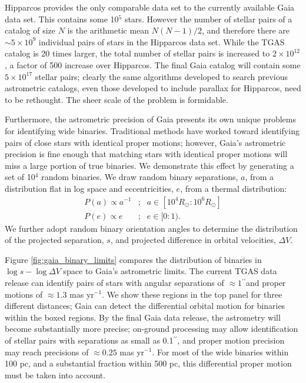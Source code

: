 \documentclass[usenatbib]{mnras}
\newcommand{\asec}{\ifmmode {^{\prime\prime}}\else$^{\prime\prime}$\fi}
\begin{document}
Hipparcos provides the only comparable data set to the currently available Gaia data set. This contains some 10$^5$ stars. However the number of stellar pairs of a catalog of size $N$ is the arithmetic mean $N(N-1)/2$, and therefore there are $\sim5\times10^9$ individual pairs of stars in the Hipparcos data set. While the TGAS catalog is 20 times larger, the total number of stellar pairs is increased to $2\times10^{12}$, a factor of 500 increase over Hipparcos. The final Gaia catalog will contain some $5\times10^{17}$ stellar pairs; clearly the same algorithms developed to search previous astrometric catalogs, even those developed to include parallax for Hipparcos, need to be rethought. The sheer scale of the problem is formidable.


Furthermore, the astrometric precision of Gaia presents its own unique problems for identifying wide binaries. Traditional methods have worked toward identifying pairs of close stars with identical proper motions; however, Gaia's astrometric precision is fine enough that matching stars with identical proper motions will miss a large portion of true binaries. We demonstrate this effect by generating a set of 10$^4$ random binaries. We draw random binary separations, $a$, from a distribution flat in log space and eccentricities, $e$, from a thermal distribution:
\begin{eqnarray}
P(a) \propto a^{-1} &;& a \in [10^4 R_{\odot}:10^6 R_{\odot}] \\
P(e) \propto e\ \ \ &;& e \in [0:1).
\end{eqnarray}
We further adopt random binary orientation angles to determine the distribution of the projected separation, $s$, and projected difference in orbital velocities, $\Delta V$. 

Figure \ref{fig:gaia_binary_limits} compares the distribution of binaries in $\log s-\log \Delta V$ space to Gaia's astrometric limits. The current TGAS data release can identify pairs of stars with angular separations of $\approx1$\asec and proper motions of $\approx 1.3 $ mas yr$^{-1}$. We show these regions in the top panel for three different distances; Gaia can detect the differential orbital motion for binaries within the boxed regions. By the final Gaia data release, the astrometry will become substantially more precise; on-ground processing may allow identification of stellar pairs with separations as small as 0.1\asec \citep{harrison11}, and proper motion precision may reach precisions of $\approx0.25$ mas yr$^{-1}$. For most of the wide binaries within 100 pc, and a substantial fraction within 500 pc, this differential proper motion must be taken into account.
\end{document}
